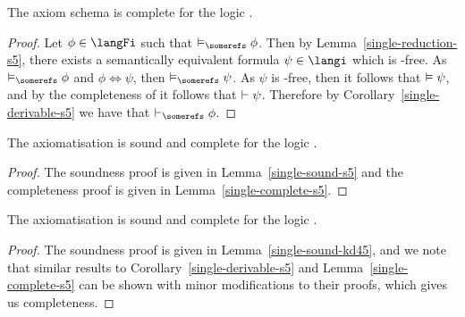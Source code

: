 \begin{lemma}\label{single-complete-s5}
The axiom schema \axiomSiF{} is complete for the logic \logicSiF{}.
\end{lemma}

\begin{proof}
Let $\phi \in \langFi$ such that $\entails_\somerefs \phi$. Then by
Lemma~\ref{single-reduction-s5}, there exists a semantically equivalent formula
$\psi \in \langi$ which is \somerefs-free. As $\entails_\somerefs \phi$ and
$\phi \iff \psi$, then $\entails_\somerefs \psi$. As $\psi$ is
\somerefs-free, then it follows that $\vDash \psi$, and by the
completeness of \axiomSiF{} it follows that $\vdash \psi$.
Therefore by Corollary~\ref{single-derivable-s5} we have that $\proves_\somerefs
\phi$.
\end{proof}

\begin{theorem}
The axiomatisation \axiomSiF{} is sound and complete for the logic \logicSiF{}.
\end{theorem}

\begin{proof}
The soundness proof is given in Lemma~\ref{single-sound-s5} and the completeness
proof is given in Lemma~\ref{single-complete-s5}.
\end{proof}

\begin{theorem}
The axiomatisation \axiomKDiF{} is sound and complete for the logic \logicKDiF{}.
\end{theorem}

\begin{proof}
The soundness proof is given in Lemma~\ref{single-sound-kd45}, and we note that
similar results to Corollary~\ref{single-derivable-s5} and
Lemma~\ref{single-complete-s5} can be shown with minor modifications to their
proofs, which gives us completeness.
\end{proof}
